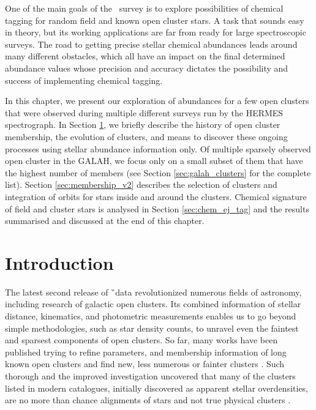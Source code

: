 One of the main goals of the \Gh\ survey is to explore possibilities of chemical tagging for random field and known open cluster stars. A task that sounds easy in theory, but its working applications are far from ready for large spectroscopic surveys. The road to getting precise stellar chemical abundances leads around many different obstacles, which all have an impact on the final determined abundance values whose precision and accuracy dictates the possibility and success of implementing chemical tagging.

In this chapter, we present our exploration of abundances for a few open clusters that were observed during multiple different surveys run by the HERMES spectrograph. In Section \ref{sec:intro_tag}, we briefly describe the history of open cluster membership, the evolution of clusters, and means to discover these ongoing processes using stellar abundance information only. Of multiple sparsely observed open cluster in the GALAH, we focus only on a small subset of them that have the highest number of members (see Section \ref{sec:galah_clusters} for the complete list). Section \ref{sec:membership_v2} describes the selection of clusters and integration of orbits for stars inside and around the clusters. Chemical signature of field and cluster stars is analysed in Section \ref{sec:chem_ej_tag} and the results summarised and discussed at the end of this chapter.

\section{Introduction}
\label{sec:intro_tag}
The latest second release of \G\ data \citep[DR2,][]{2018arXiv180409365G} revolutionized numerous fields of astronomy, including research of galactic open clusters. Its combined information of stellar distance, kinematics, and photometric measurements enables us to go beyond simple methodologies, such as star density counts, to unravel even the faintest and sparsest components of open clusters. So far, many works have been published trying to refine parameters, and membership information of long known open clusters \citep{2017A&A...601A..19G, 2018A&A...618A..93C, 2019A&A...627A..35C} and find new, less numerous or fainter clusters \citep{2019ApJS..245...32L, 2019JKAS...52..145S, 2019A&A...624A.126C, 2020arXiv200107122C}. Such thorough and the improved investigation uncovered that many of the clusters listed in modern catalogues, initially discovered as apparent stellar overdensities, are no more than chance alignments of stars and not true physical clusters \citep{1998A&A...340..402B, 2000A&A...357..145C, 2016AJ....152....7H, 2018MNRAS.480.5242K, 2020A&A...633A..99C}.

